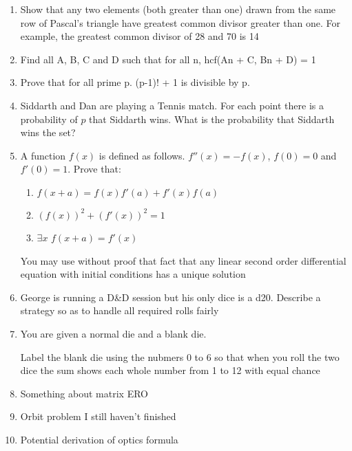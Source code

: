\documentclass[a4paper]{article}
\begin{document}
\begin{enumerate}
\item
Show that any two elements (both greater than one) drawn from the same row of Pascal's triangle have greatest common divisor greater than one.  For example, the greatest common divisor of 28 and 70 is 14

\item
Find all A, B, C and D such that for all n, hcf(An + C, Bn + D) = 1

\item
Prove that for all prime p. (p-1)! + 1 is divisible by p.

\item
Siddarth and Dan are playing a Tennis match. For each point there is a probability of $p$ that Siddarth wins. What is the probability that Siddarth wins the set?

\item
A function $f(x)$ is defined as follows. $f''(x) = -f(x)$, $f(0) = 0$ and $f'(0) = 1$. Prove that:
\begin{enumerate}
    \item $f(x + a) = f(x)f'(a) + f'(x)f(a)$
    \item $(f(x))^2 + (f'(x))^2 = 1$
    \item $\exists x$ $f(x+a) = f'(x)$
\end{enumerate}
You may use without proof that fact that any linear second order differential equation with initial conditions has a unique solution

\item
George is running a D\&D session but his only dice is a d20. Describe a strategy so as to handle all required rolls fairly

\item
You are given a normal die and a blank die.

Label the blank die using the nubmers 0 to 6 so that when you roll the two dice the sum shows each whole number from 1 to 12 with equal chance

\item
Something about matrix ERO

\item
Orbit problem I still haven't finished

\item
Potential derivation of optics formula


\end{enumerate}
\end{document}
